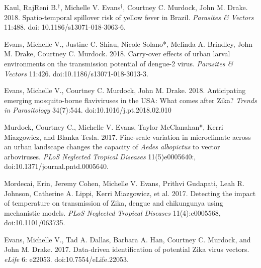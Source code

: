 \begin{etaremune}
\item Kaul, RajReni B.$^\dagger$, \textcolor{awesome}{Michelle V. Evans}$^\dagger$, Courtney C. Murdock, John M. Drake. 2018. Spatio-temporal spillover risk of yellow fever in Brazil. \textit{Parasites \& Vectors} 11:488. doi: 10.1186/s13071-018-3063-6.
\smallskip

\item \textcolor{awesome}{Evans, Michelle V.}, Justine C. Shiau, Nicole Solano*, Melinda A. Brindley, John M. Drake, Courtney C. Murdock. 2018. Carry-over effects of urban larval environments on the transmission potential of dengue-2 virus. \textit{Parasites \& Vectors} 11:426. doi:10.1186/s13071-018-3013-3.

\item \textcolor{awesome}{Evans, Michelle V.}, Courtney C. Murdock, John M. Drake. 2018. Anticipating emerging mosquito-borne flaviviruses in the USA: What comes after Zika? \textit{Trends in Parasitology} 34(7):544. \linebreak doi:10.1016/j.pt.2018.02.010

\item Murdock, Courtney C., \textcolor{awesome}{Michelle V. Evans}, Taylor McClanahan*, Kerri Miazgowicz, and Blanka Tesla. 2017. Fine-scale variation in microclimate across an urban landscape changes the capacity of \textit{Aedes albopictus} to vector arboviruses. \textit{PLoS Neglected Tropical Diseases} 11(5)e0005640:, \linebreak doi:10.1371/journal.pntd.0005640.
\smallskip

\item Mordecai, Erin, Jeremy Cohen, \textcolor{awesome}{Michelle V. Evans}, Prithvi Gudapati, Leah R. Johnson, Catherine A. Lippi, Kerri Miazgowicz, et al. 2017. Detecting the impact of temperature on transmission of Zika, dengue and chikungunya using mechanistic models. \textit{PLoS Neglected Tropical Diseases} 11(4):e0005568, \linebreak doi:10.1101/063735.
\smallskip

\item \textcolor{awesome}{Evans, Michelle V.}, Tad A. Dallas, Barbara A. Han, Courtney C. Murdock, and John M. Drake. 2017. Data-driven identification of potential Zika virus vectors. \textit{eLife} 6: e22053. doi:10.7554/eLife.22053.

\end{etaremune}

\bigskip
